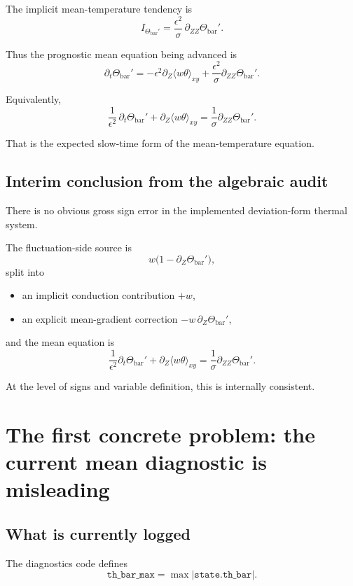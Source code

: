 \documentclass[11pt]{article}
\begin{document}
The implicit mean-temperature tendency is
\[
I_{\Theta_{\mathrm{bar}}'}
=
\frac{\epsilon^2}{\sigma}\,\partial_{ZZ}\Theta_{\mathrm{bar}}'.
\]

Thus the prognostic mean equation being advanced is
\[
\partial_t \Theta_{\mathrm{bar}}'
=
-\epsilon^2 \partial_Z\langle w\theta\rangle_{xy}
+
\frac{\epsilon^2}{\sigma}\partial_{ZZ}\Theta_{\mathrm{bar}}'.
\]

Equivalently,
\[
\frac{1}{\epsilon^2}\,\partial_t \Theta_{\mathrm{bar}}'
+
\partial_Z\langle w\theta\rangle_{xy}
=
\frac{1}{\sigma}\partial_{ZZ}\Theta_{\mathrm{bar}}'.
\]

That is the expected slow-time form of the mean-temperature equation.

\subsection{Interim conclusion from the algebraic audit}

There is no obvious gross sign error in the implemented deviation-form thermal system.

The fluctuation-side source is
\[
w\bigl(1-\partial_Z\Theta_{\mathrm{bar}}'\bigr),
\]
split into

\begin{itemize}
\item an implicit conduction contribution $+w$,
\item an explicit mean-gradient correction $-w\,\partial_Z\Theta_{\mathrm{bar}}'$,
\end{itemize}

and the mean equation is
\[
\frac{1}{\epsilon^2}\partial_t\Theta_{\mathrm{bar}}'
+
\partial_Z\langle w\theta\rangle_{xy}
=
\frac{1}{\sigma}\partial_{ZZ}\Theta_{\mathrm{bar}}'.
\]

At the level of signs and variable definition, this is internally consistent.

\section{The first concrete problem: the current mean diagnostic is misleading}

\subsection{What is currently logged}

The diagnostics code defines
\[
\texttt{th\_bar\_max}
=
\max |\texttt{state.th\_bar}|.
\]
\end{document}
